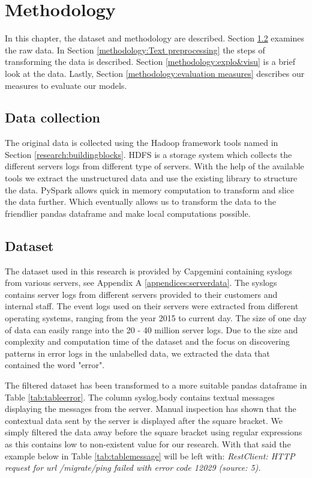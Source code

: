 \chapter{Methodology}  \label{ch:methodology}

In this chapter, the dataset and methodology are described. Section \ref{methodology:dataset} examines the raw data. In Section \ref{methodology:Text preprocessing} the steps of transforming the data is described. Section \ref{methodology:explo&visu} is a brief look at the data. Lastly, Section \ref{methodology:evaluation measures} describes our measures to evaluate our models.

\section{Data collection}
The original data is collected using the Hadoop framework tools named in Section \ref{research:buildingblocks}. HDFS is a storage system which collects the different servers logs from different type of servers. With the help of the available tools we extract the unstructured data and use the existing library to structure the data. PySpark allows quick in memory computation to transform and slice the data further. Which eventually allows us to transform the data to the friendlier pandas dataframe and make local computations possible.  
 
\section{Dataset}\label{methodology:dataset}
The dataset used in this research is provided by Capgemini containing syslogs from various servers, see Appendix A \ref{appendices:serverdata}. The syslogs contains server logs from different servers provided to their customers and internal staff. The event logs used on their servers were extracted from different operating systems, ranging from the year 2015 to current day. The size of one day of data can easily range into the 20 - 40 million server logs. Due to the size and complexity and computation time of the dataset and the focus on discovering patterns in error logs in the unlabelled data, we extracted the data that contained the word "error". 

The filtered dataset has been transformed to a more suitable pandas dataframe in Table \ref{tab:tableerror}. The column syslog.body contains textual messages displaying the messages from the server. Manual inspection has shown that the contextual data sent by the server is displayed after the square bracket. We simply filtered the data away before the square bracket using regular expressions as this contains low to non-existent value for our research. 
With that said the example below in Table \ref{tab:tablemessage} will be left with: \textit{RestClient: HTTP request for url /migrate/ping failed with error code 12029 (source: 5).} 

